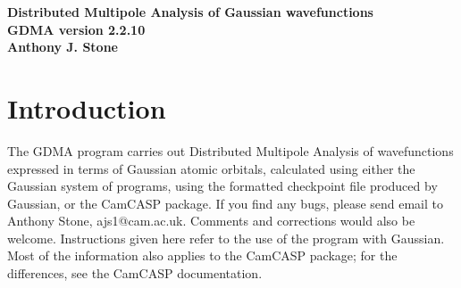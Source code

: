 \documentclass[12pt,txfonts]{paper}
\let\cite=\citep
\begin{document}
\begin{center}
\textbf{Distributed Multipole Analysis of Gaussian wavefunctions\\[3pt]
GDMA version 2.2.10\\[4 pt]
Anthony J. Stone}
\end{center}

\section{Introduction}

The GDMA program carries out Distributed Multipole Analysis of
wavefunctions expressed in terms of Gaussian atomic orbitals,
calculated using either the Gaussian system of
programs\cite{Gaussian03}, using the formatted checkpoint file produced by
Gaussian, or the {\sc CamCASP} package\cite{CamCASP}.
If you find any bugs, please send email to Anthony
Stone, ajs1@cam.ac.uk. Comments and corrections would also be welcome.
Instructions given here refer to the use of the program with Gaussian.
Most of the information also applies to the {\sc CamCASP} package; for
the differences, see the {\sc CamCASP} documentation.
\end{document}
